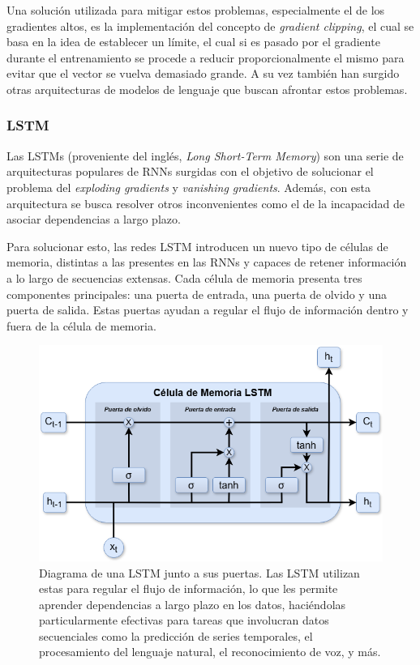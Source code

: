 Una solución utilizada para mitigar estos problemas, especialmente el de los gradientes altos, es la implementación del concepto de \textit{gradient clipping}, el cual se basa en la idea de establecer un límite, el cual si es pasado por el gradiente durante el entrenamiento se procede a reducir proporcionalmente el mismo para evitar que el vector se vuelva demasiado grande. \parencite{pascanu2013difficultytrainingrecurrentneural} A su vez también han surgido otras arquitecturas de modelos de lenguaje que buscan afrontar estos problemas.

\subsubsection{LSTM}

Las LSTMs (proveniente del inglés, \textit{Long Short-Term Memory}) son una serie de arquitecturas populares de RNNs surgidas con el objetivo de solucionar el problema del \textit{exploding gradients} y \textit{vanishing gradients}. Además, con esta arquitectura se busca resolver otros inconvenientes como el de la incapacidad de asociar dependencias a largo plazo. \parencite{lstm}

Para solucionar esto, las redes LSTM introducen un nuevo tipo de células de memoria, distintas a las presentes en las RNNs y capaces de retener información a lo largo de secuencias extensas. Cada célula de memoria presenta tres componentes principales: una puerta de entrada, una puerta de olvido y una puerta de salida. Estas puertas ayudan a regular el flujo de información dentro y fuera de la célula de memoria.

\begin{figure}[H]
    \centering
    \includegraphics[width=1\textwidth]{imagenes/LSTM.png}
    \caption{Diagrama de una LSTM junto a sus puertas. Las LSTM utilizan estas para regular el flujo de información, lo que les permite aprender dependencias a largo plazo en los datos, haciéndolas particularmente efectivas para tareas que involucran datos secuenciales como la predicción de series temporales, el procesamiento del lenguaje natural, el reconocimiento de voz, y más.}
    \label{fig:lstm}
\end{figure}

